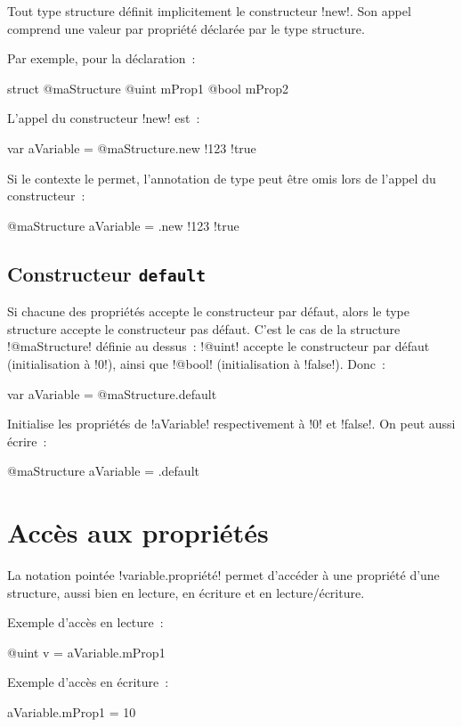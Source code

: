 Tout type structure définit implicitement le constructeur \ggs!new!. Son appel comprend une valeur par propriété déclarée par le type structure.

Par exemple, pour la déclaration~:
\begin{galgas}
struct @maStructure {
  @uint mProp1
  @bool mProp2
}
\end{galgas}

L'appel du constructeur \ggs!new! est~:
\begin{galgas}
var aVariable = @maStructure.new {!123 !true}
\end{galgas}

Si le contexte le permet, l'annotation de type peut être omis lors de l'appel du constructeur~:
\begin{galgas}
@maStructure aVariable = .new {!123 !true}
\end{galgas}


\subsection{Constructeur \texttt{default}}

Si chacune des propriétés accepte le constructeur par défaut, alors le type structure accepte le constructeur pas défaut. C'est le cas de la structure \ggs!@maStructure! définie au dessus~: \ggs!@uint! accepte le constructeur par défaut (initialisation à \ggs!0!), ainsi que \ggs!@bool! (initialisation à \ggs!false!). Donc~:
\begin{galgas}
var aVariable = @maStructure.default
\end{galgas}
Initialise les propriétés de \ggs!aVariable! respectivement à \ggs!0! et \ggs!false!. On peut aussi écrire~:
\begin{galgas}
@maStructure aVariable = .default
\end{galgas}


\section{Accès aux propriétés}

La notation pointée \ggs!variable.propriété! permet d'accéder à une propriété d'une structure, aussi bien en lecture, en écriture et en lecture/écriture.

Exemple d'accès en lecture~:
\begin{galgas}
@uint v = aVariable.mProp1
\end{galgas}

Exemple d'accès en écriture~:
\begin{galgas}
aVariable.mProp1 = 10
\end{galgas}


